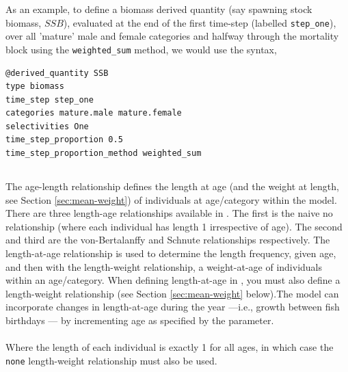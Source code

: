 As an example, to define a biomass derived quantity (say spawning stock biomass, $SSB$), evaluated at the end of the first time-step (labelled \texttt{step\_one}), over all 'mature' male and female categories and halfway through the mortality block using the \texttt{weighted\_sum} method, we would use the syntax,

{\small{\begin{verbatim}
@derived_quantity SSB
type biomass
time_step step_one
categories mature.male mature.female
selectivities One
time_step_proportion 0.5
time_step_proportion_method weighted_sum
\end{verbatim}}}

\subsection{\label{sec:age-at-age}}

The age-length relationship defines the length at age (and the weight at length, see Section \ref{sec:mean-weight}) of individuals at age/category within the model. There are three length-age relationships available in \CNAME. The first is the naive no relationship (where each individual has length 1 irrespective of age). The second  and third are the von-Bertalanffy and Schnute relationships respectively. The length-at-age relationship is used to determine the length frequency, given age, and then with the length-weight relationship, a weight-at-age of individuals within an age/category. When defining length-at-age in \CNAME, you must also define a length-weight relationship (see Section \ref{sec:mean-weight} below).The model can incorporate changes in length-at-age during the year —i.e., growth between fish birthdays — by incrementing age as specified by the  parameter.

\paragraph[None]{}
Where the length of each individual is exactly 1 for all ages, in which case the \texttt{none} length-weight relationship must also be used.


